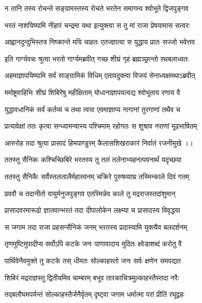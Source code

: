 \twolineshloka
{न तानि तस्य रोचन्ते सङ्ग्रामस्तस्य रोचते}
{भरतेन समागम्य श्वोभूते द्विजपुङ्गव}%

\twolineshloka
{भरतं नाशयिष्यामि नीहारं चन्द्रमा यथा}
{इत्युक्त्वा स तु मां राजा प्रेषयामास सत्वरः}%

\twolineshloka
{आह्वानदुन्दुभिस्तत्र निष्क्रान्ते मयि चाहतः}
{एतज्ज्ञात्वा स युद्धाय प्रातः सज्जो भवेत्तव}%


\twolineshloka
{इति गार्ग्यवचः श्रुत्वा भरतो गार्ग्यमब्रवीत्}
{गच्छ शीघ्रं गृहं ब्रह्मञ्छ्रान्तो रथबलाध्वतः}%

\twolineshloka
{अहमाज्ञापयिष्यामि सर्वं साङ्ग्रामिकं विधिम्}
{एतावदुक्त्वा विजयं सेनाध्यक्षमथाऽब्रवीत्}%

\twolineshloka
{ममोष्ट्रवाहिभिः शीघ्रं शिबिरेषु महीक्षिताम्}
{योधानाज्ञापयत्वद्य श्वोभूताय रणाय वै} %

\twolineshloka
{युद्धावधानिकं सर्वं कर्तव्यं च तथा त्वया}
{एवमाज्ञाप्य नागानां तुरगाणां तथैव च}%

\twolineshloka
{प्रत्यावेक्षां ततः कृत्वा सन्ध्यामन्वास्य पश्चिमाम्}
{रहोगतः स शुश्राव नराणां मूढभाषितम्}%

\twolineshloka
{आरुरोह तदा श्रुत्वा प्रासादं हिमपाण्डुरम्}
{कैलासशिखराकारं निर्वातं रजनीमुखे ।।}%

\twolineshloka
{ततस्तु सैनिकः कश्चिच्छिबिरे भरतस्य तु}
{तलं तलेनाभ्यहनत्पवनार्थं यदृच्छया}%

\twolineshloka
{ततस्तु सैनिकैः सर्वैस्तलतालैर्महास्वनम्}
{चक्रिरे पुरुषव्याघ्र तस्मिन्काले दिवं गतम्}%

\twolineshloka
{प्रववौ च तदानीतो वायुर्मनुजपुङ्गव}
{एतस्मिन्नेव काले तु मद्रराजस्तदांशुमान्}%

\twolineshloka
{प्रासादवरमारूढो ज्ञातवान्भरतं तदा}
{दीपालोकेन लक्ष्म्या च प्रासादस्य विवृद्धया}%

\twolineshloka
{स जगाम तदा राजा प्रहसन्सैनिकं जनम्}
{भरतस्य प्रदास्यामि युक्त्यैव बलदर्शनम्}%

\twolineshloka
{तृणमुष्टिमुपादीप्य सर्वोऽपि कटके जनः}
{पाणावादाय मुदितः क्ष्वेडाशब्दं करोतु वै}%

\twolineshloka
{पार्थिवेनैवमुक्ते तु कटके तस् धीमतः}
{सोल्काहस्तो जनः सर्वः क्षणेन समपद्यत} %

\twolineshloka
{शिबिरं मद्रराज्ञस्तु द्वितीयमिव चाम्बरम्}
{बभूव तारकाचित्रमुल्काहस्तैस्तदा नरैः}%

\twolineshloka
{तद्बलौघमपर्यन्तं सोल्काहस्तैर्जनैर्वृतम्}
{दृष्ट्वा जगाम धर्मात्मा परां प्रीतिं रघूद्वहः}%

